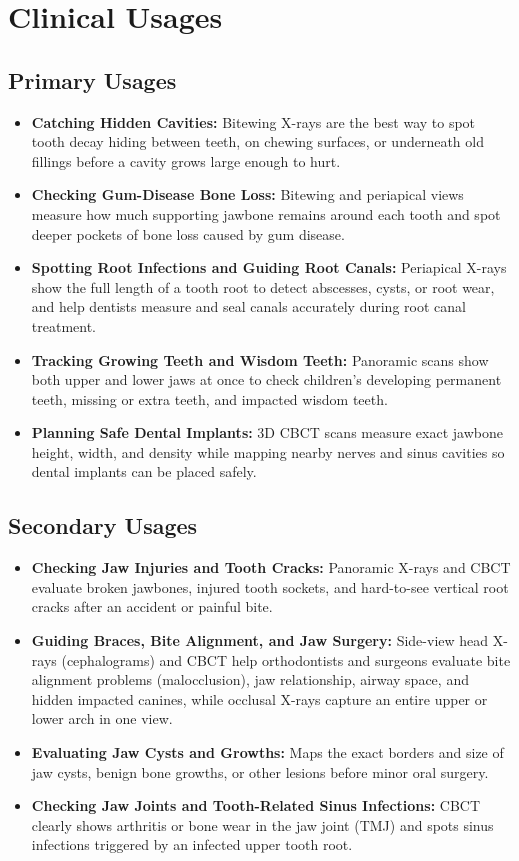 \section{Clinical Usages}

\subsection{Primary Usages}
\begin{itemize}
\item \textbf{Catching Hidden Cavities:} Bitewing X-rays are the best way to spot tooth decay hiding between teeth, on chewing surfaces, or underneath old fillings before a cavity grows large enough to hurt.
\item \textbf{Checking Gum-Disease Bone Loss:} Bitewing and periapical views measure how much supporting jawbone remains around each tooth and spot deeper pockets of bone loss caused by gum disease.
\item \textbf{Spotting Root Infections and Guiding Root Canals:} Periapical X-rays show the full length of a tooth root to detect abscesses, cysts, or root wear, and help dentists measure and seal canals accurately during root canal treatment.
\item \textbf{Tracking Growing Teeth and Wisdom Teeth:} Panoramic scans show both upper and lower jaws at once to check children's developing permanent teeth, missing or extra teeth, and impacted wisdom teeth.
\item \textbf{Planning Safe Dental Implants:} 3D CBCT scans measure exact jawbone height, width, and density while mapping nearby nerves and sinus cavities so dental implants can be placed safely.
\end{itemize}

\subsection{Secondary Usages}
\begin{itemize}
\item \textbf{Checking Jaw Injuries and Tooth Cracks:} Panoramic X-rays and CBCT evaluate broken jawbones, injured tooth sockets, and hard-to-see vertical root cracks after an accident or painful bite.
\item \textbf{Guiding Braces, Bite Alignment, and Jaw Surgery:} Side-view head X-rays (cephalograms) and CBCT help orthodontists and surgeons evaluate bite alignment problems (malocclusion), jaw relationship, airway space, and hidden impacted canines, while occlusal X-rays capture an entire upper or lower arch in one view.
\item \textbf{Evaluating Jaw Cysts and Growths:} Maps the exact borders and size of jaw cysts, benign bone growths, or other lesions before minor oral surgery.
\item \textbf{Checking Jaw Joints and Tooth-Related Sinus Infections:} CBCT clearly shows arthritis or bone wear in the jaw joint (TMJ) and spots sinus infections triggered by an infected upper tooth root.
\end{itemize}

